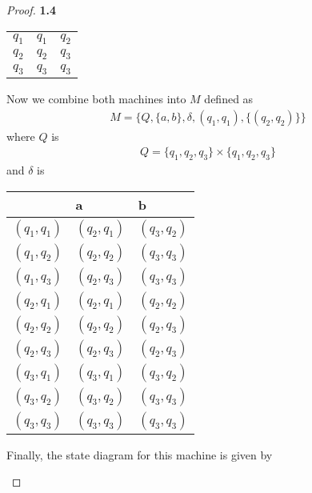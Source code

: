 \documentclass[11pt]{article}
\theoremstyle{definition}
\begin{document}
\begin{proof}{\textbf{1.4}}
\begin{itemize}
\begin{center}
\begin{tabular}{l|ll}
            $q_1$ & $q_1$ & $q_2$ \\
            $q_2$ & $q_2$ & $q_3$ \\
            $q_3$ & $q_3$ & $q_3$ \\
        \end{tabular}
        \end{center}
        Now we combine both machines into $M$ defined as
        \begin{align*}
            M = \{Q, \{a,b\}, \delta, (q_1,q_1), \{(q_2, q_2)\}\}
        \end{align*}
        where $Q$ is 
        \begin{align*}
            Q =\{q_1, q_2, q_3\} \times \{q_1, q_2, q_3\}
        \end{align*}
        and $\delta$ is 
        \begin{center}
        \begin{tabular}{l|ll}
                  & a     & b     \\ \hline
            $(q_1, q_1)$ & $(q_2, q_1)$ & $(q_3, q_2)$ \\
            $(q_1, q_2)$ & $(q_2, q_2)$ & $(q_3, q_3)$ \\
            $(q_1, q_3)$ & $(q_2, q_3)$ & $(q_3, q_3)$ \\
            $(q_2, q_1)$ & $(q_2, q_1)$ & $(q_2, q_2)$ \\
            $(q_2, q_2)$ & $(q_2, q_2)$ & $(q_2, q_3)$ \\
            $(q_2, q_3)$ & $(q_2, q_3)$ & $(q_2, q_3)$ \\
            $(q_3, q_1)$ & $(q_3, q_1)$ & $(q_3, q_2)$ \\
            $(q_3, q_2)$ & $(q_3, q_2)$ & $(q_3, q_3)$ \\
            $(q_3, q_3)$ & $(q_3, q_3)$ & $(q_3, q_3)$ \\
        \end{tabular}
        \end{center}
        Finally, the state diagram for this machine is given by
        \begin{figure}[H]
            \centering %
\end{figure}
\end{itemize}
\end{proof}
\end{document}
